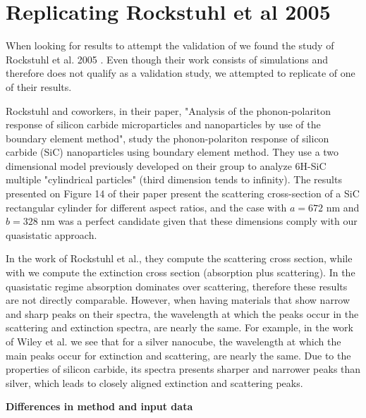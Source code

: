 
\section{Replicating Rockstuhl et al 2005} \label{sec:rep_rockstuhl}
\graphicspath{{replication_validation/figs/}}

When looking for results to attempt the validation of \pygbe we found the study of Rockstuhl et al. 2005 \cite{rockstuhl2005}. 
Even though their work consists of simulations and therefore does not qualify as a validation study, we 
attempted to replicate of one of their results. 

Rockstuhl and coworkers, in their paper, "Analysis of the phonon-polariton response of silicon carbide microparticles 
and nanoparticles by use of the boundary element method", study the phonon-polariton response of silicon carbide (SiC)
nanoparticles using boundary element method. They use a two dimensional model previously developed on their group \cite{rockstuhl2003}
to analyze 6H-SiC multiple "cylindrical particles" (third dimension tends to infinity). The results presented on Figure 14 of their paper  
present the scattering cross-section of a SiC rectangular cylinder for different aspect ratios, and the case with $a = 672$ nm and $b = 328$ nm
was a perfect candidate given that these dimensions comply with our quasistatic approach.

In the work of Rockstuhl et al., they compute the scattering cross section, while with \pygbe we compute the extinction cross section 
(absorption plus scattering). In the quasistatic regime absorption dominates over scattering, therefore these results are not directly
comparable. However, when having materials that show narrow and sharp peaks on their spectra, the wavelength at which the peaks occur 
in the scattering and extinction spectra, are nearly the same. For example, in the work of Wiley et al. \cite{wiley-etal-2006}
we see that for a silver nanocube, the wavelength at which the main peaks occur for extinction and scattering, are nearly the same. Due to the properties 
of silicon carbide, its spectra presents sharper and narrower peaks than silver, which leads to closely aligned extinction and scattering peaks.

\textbf{Differences in method and input data}

